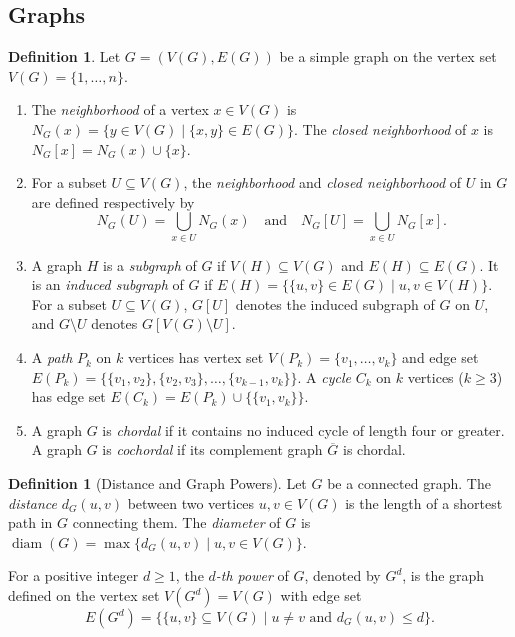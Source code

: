 \documentclass[10pt,a4paper]{amsart}
\numberwithin{equation}{section}
\theoremstyle{definition}
\newtheorem{defn}[thm]{Definition}
\begin{document}
\subsection{Graphs}

\begin{defn}
Let $G = (V(G), E(G))$ be a simple graph on the vertex set $V(G) = \{1, \ldots, n\}$.
\begin{enumerate}
    \item The \emph{neighborhood} of a vertex $x \in V(G)$ is $N_G(x) = \{y \in V(G) \mid \{x, y\} \in E(G)\}$. The \emph{closed neighborhood} of $x$ is $N_G[x] = N_G(x) \cup \{x\}$.
    \item For a subset $U \subseteq V(G)$, the \emph{neighborhood} and \emph{closed neighborhood} of $U$ in $G$ are defined respectively by 
    \[
    N_G(U) = \bigcup_{x \in U} N_G(x) \quad \text{and} \quad N_G[U] = \bigcup_{x \in U} N_G[x].
    \]
    \item A graph $H$ is a \emph{subgraph} of $G$ if $V(H) \subseteq V(G)$ and $E(H) \subseteq E(G)$. It is an \emph{induced subgraph} of $G$ if $E(H) = \{\{u, v\} \in E(G) \mid u, v \in V(H)\}$. For a subset $U \subseteq V(G)$, $G[U]$ denotes the induced subgraph of $G$ on $U$, and $G \setminus U$ denotes $G[V(G) \setminus U]$.
    \item A \emph{path} $P_k$ on $k$ vertices has vertex set $V(P_k) = \{v_1, \ldots, v_k\}$ and edge set $E(P_k) = \{\{v_1, v_2\}, \{v_2, v_3\}, \ldots, \{v_{k-1}, v_k\}\}$. A \emph{cycle} $C_k$ on $k$ vertices ($k \ge 3$) has edge set $E(C_k) = E(P_k) \cup \{\{v_1, v_k\}\}$.
    \item A graph $G$ is \emph{chordal} if it contains no induced cycle of length four or greater. A graph $G$ is \emph{cochordal} if its complement graph $\overline{G}$ is chordal.
\end{enumerate}
\end{defn}


\begin{defn}[Distance and Graph Powers]
Let $G$ be a connected graph. The \emph{distance} $d_G(u, v)$ between two vertices $u, v \in V(G)$ is the length of a shortest path in $G$ connecting them. The \emph{diameter} of $G$ is $\operatorname{diam}(G) = \max\{d_G(u, v) \mid u, v \in V(G)\}$.

For a positive integer $d \ge 1$, the \emph{$d$-th power} of $G$, denoted by $G^d$, is the graph defined on the vertex set $V(G^d) = V(G)$ with edge set
\[
E(G^d) = \{\{u, v\} \subseteq V(G) \mid u \neq v \text{ and } d_G(u, v) \le d\}.
\]
\end{defn}
\end{document}
